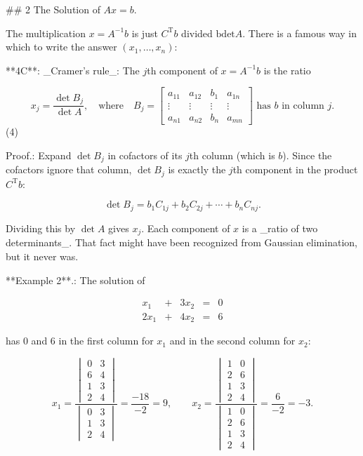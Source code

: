 

## 2 The Solution of \(Ax=b\).

The multiplication \(x=A^{-1}b\) is just \(C^{\mathrm{T}}b\) divided \(\mathrm{bdet}A\). There is a famous way in which to write the answer \((x_{1},\ldots,x_{n})\):

**4C**: _Cramer's rule_: The \(j\)th component of \(x=A^{-1}b\) is the ratio

\[x_{j}=\frac{\det B_{j}}{\det A},\quad\text{where}\quad B_{j}=\begin{bmatrix}a_ {11}&a_{12}&b_{1}&a_{1n}\\ \vdots&\vdots&\vdots&\vdots\\ a_{n1}&a_{n2}&b_{n}&a_{mn}\end{bmatrix}\text{ has $b$ in column $j$.}\] (4)

Proof.: Expand \(\det B_{j}\) in cofactors of its \(j\)th column (which is \(b\)). Since the cofactors ignore that column, \(\det B_{j}\) is exactly the \(j\)th component in the product \(C^{\mathrm{T}}b\):

\[\det B_{j}=b_{1}C_{1j}+b_{2}C_{2j}+\cdots+b_{n}C_{nj}.\]

Dividing this by \(\det A\) gives \(x_{j}\). Each component of \(x\) is a _ratio of two determinants_. That fact might have been recognized from Gaussian elimination, but it never was. 

**Example 2**.: The solution of

\[\begin{array}{rclrcl}x_{1}&+&3x_{2}&=&0\\ 2x_{1}&+&4x_{2}&=&6\end{array}\]

has 0 and 6 in the first column for \(x_{1}\) and in the second column for \(x_{2}\):

\[x_{1}=\frac{\begin{vmatrix}0&3\\ 6&4\\ \hline 1&3\\ 2&4\end{vmatrix}}{\begin{vmatrix}0&3\\ \hline 1&3\\ 2&4\end{vmatrix}}=\frac{-18}{-2}=9,\qquad x_{2}=\frac{\begin{vmatrix}1&0\\ 2&6\\ \hline 1&3\\ 2&4\end{vmatrix}}{\begin{vmatrix}1&0\\ 2&6\\ \hline 1&3\\ 2&4\end{vmatrix}}=\frac{6}{-2}=-3.\]

